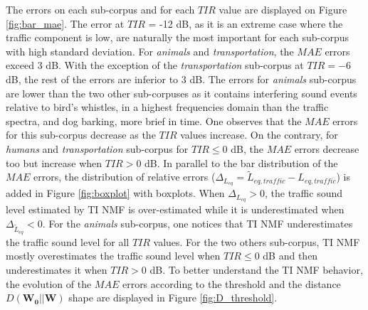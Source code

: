 \documentclass[12pt,english,twoside]{article}
\begin{document}
The errors on each sub-corpus and for each $TIR$ value are displayed on Figure \ref{fig:bar_mae}.
The error at $TIR$ = -12 dB, as it is an extreme case where the traffic component is low, are naturally the most important for each sub-corpus with high standard deviation. For \textit{animals} and \textit{transportation}, the $MAE$ errors exceed 3 dB. With the exception of the \textit{transportation} sub-corpus at $TIR = -6$ dB, the rest of the errors are inferior to 3 dB.
The errors for \textit{animals} sub-corpus are lower than the two other sub-corpuses as it contains interfering sound events relative to bird's whistles, in a highest frequencies domain than the traffic spectra, and dog barking, more brief in time.
One observes that the $MAE$ errors for this sub-corpus decrease as the $TIR$ values increase. On the contrary, for \textit{humans} and \textit{transportation} sub-corpus for $TIR \leq 0$ dB, the $MAE$ errors decrease too but increase when $TIR > 0$ dB.
In parallel to the bar distribution of the $MAE$ errors, the distribution of relative errors ($\Delta_{L_{eq}} = \tilde{L}_{eq,traffic}-L_{eq,traffic}$) is added in Figure \ref{fig:boxplot} with boxplots. When $\Delta_{L_{eq}} > 0$, the traffic sound level estimated by TI NMF is over-estimated while it is underestimated when $\Delta_{\tilde{L}_{eq}} < 0$. 
For the \textit{animals} sub-corpus, one notices that TI NMF underestimates the traffic sound level for all $TIR$ values. For the two others sub-corpus, TI NMF mostly  overestimates the traffic sound level when $TIR \leq 0$ dB and then underestimates it when $TIR > 0$ dB.
To better understand the TI NMF behavior, the evolution of the $MAE$ errors according to the threshold and the distance $D(\mathbf{W_0}\vert \vert \mathbf{W})$ shape are displayed in Figure \ref{fig:D_threshold}.
\end{document}
